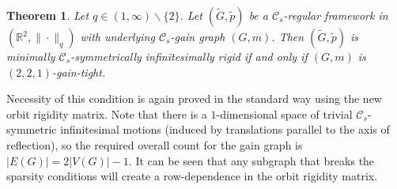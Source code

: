 \documentclass[reqno,a4paper,10pt]{article}
\newtheorem{theorem}{Theorem}[section]
\theoremstyle{definition}
\theoremstyle{remark}
\numberwithin{equation}{section}
\numberwithin{figure}{section}
\numberwithin{table}{section}
\newcommand{\R}{\mathbb{R}}
\newcommand{\G}{\tilde{G}}
\newcommand{\p}{\tilde{p}}
\begin{document}
    \begin{theorem}\label{Reflectivelq}
        Let $q\in(1,\infty)\backslash\{2\}$. Let $(\G,\p)$ be a $\mathcal{C}_s$-regular framework in $(\R^2,\|\cdot\|_q)$ with underlying $\mathcal{C}_s$-gain graph $(G,m)$. Then $(\G,\p)$ is minimally $\mathcal{C}_s$-symmetrically infinitesimally rigid if and only if $(G,m)$ is $(2,2,1)$-gain-tight.
    \end{theorem}
	Necessity of this condition is again proved in the standard way using the new orbit rigidity matrix. Note that there is a $1$-dimensional space of trivial $\mathcal{C}_s$-symmetric infinitesimal motions (induced by translations parallel to the axis of reflection), so the required overall count for the gain graph is $|E(G)|=2|V(G)|-1$. It can be seen that any subgraph that breaks the sparsity conditions will create a row-dependence in the orbit rigidity matrix.
    
\end{document}
